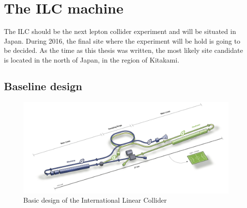 
  \section{The ILC machine}
  
    The ILC should be the next lepton collider experiment and will be situated in Japan.
    During 2016, the final site where the experiment will be hold is going to be decided.
    As the time as this thesis was written, the most likely site candidate is located in the north of Japan, in the region of Kitakami. 
    
    \subsection{Baseline design}

   \begin{figure}
      \centering
      \includegraphics[width = 15 cm]{Pictures/ILC}
      \caption{Basic design of the International Linear Collider}
      \label{fig:ILC}
    \end{figure}


